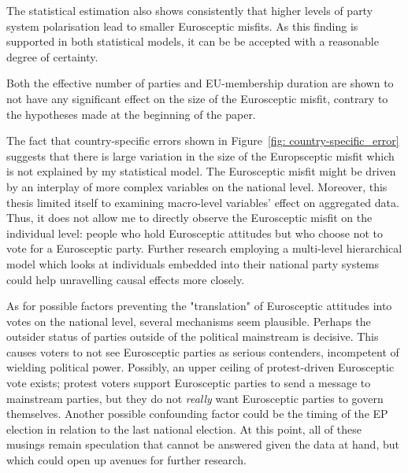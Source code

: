 The statistical estimation also shows consistently that higher levels of party system polarisation lead to smaller Eurosceptic misfits. As this finding is supported in both statistical models, it can be be accepted with a reasonable degree of certainty.

Both the effective number of parties and EU-membership duration are shown to not have any significant effect on the size of the Eurosceptic misfit, contrary to the hypotheses made at the beginning of the paper.  

The fact that country-specific errors shown in Figure~\ref{fig: country-specific_error} suggests that there is large variation in the size of the Europsceptic misfit which is not explained by my statistical model. The Eurosceptic misfit might be driven by an interplay of more complex variables on the national level. Moreover, this thesis limited itself to examining macro-level variables' effect on aggregated data. Thus, it does not allow me to directly observe the Eurosceptic misfit on the individual level: people who hold Eurosceptic attitudes but who choose not to vote for a Eurosceptic party. Further research employing a multi-level hierarchical model which looks at individuals embedded into their national party systems could help unravelling causal effects more closely.

As for possible factors preventing the "translation" of Eurosceptic attitudes into votes on the national level, several mechanisms seem plausible. Perhaps the outsider status of parties outside of the political mainstream is decisive. This causes voters to not see Eurosceptic parties as serious contenders, incompetent of wielding political power. Possibly, an upper ceiling of protest-driven Eurosceptic vote exists; protest voters support Eurosceptic parties to send a message to mainstream parties, but they do not \emph{really} want Eurosceptic parties to govern themselves. Another possible confounding factor could be the timing of the EP election in relation to the last national election.
At this point, all of these musings remain speculation that cannot be answered given the data at hand, but which could open up avenues for further research.


\pagebreak

\nocite{R-car}
\nocite{R-dplyr}
\nocite{R-ggplot2}
\nocite{R-haven}
\nocite{R-knitr}
\nocite{R-lmtest}
\nocite{R-plm}
\nocite{R-stargazer}





